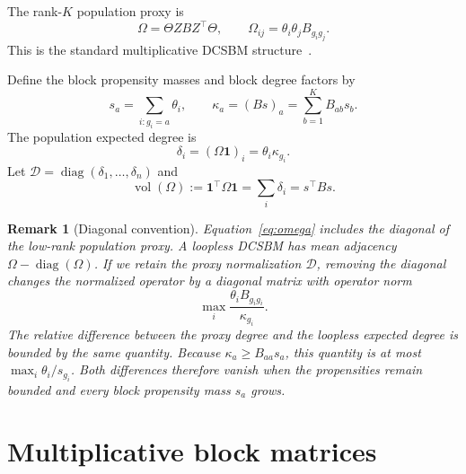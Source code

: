 \documentclass[aps,pre,reprint,superscriptaddress,longbibliography]{revtex4-2}
\newcommand{\ones}{\mathbf{1}}
\DeclareMathOperator{\vol}{vol}
\DeclareMathOperator{\diag}{diag}
\newtheorem{remark}[theorem]{Remark}
\begin{document}
The rank-\(K\) population proxy is
\begin{equation}
    \Omega=\Theta ZBZ^\top\Theta,
    \qquad
    \Omega_{ij}=\theta_i\theta_jB_{g_i g_j}.
    \label{eq:omega}
\end{equation}
This is the standard multiplicative DCSBM structure~\citep{karrer2011stochastic}.

Define the block propensity masses and block degree factors by
\begin{equation}
    s_a=\sum_{i:g_i=a}\theta_i,
    \qquad
    \kappa_a=(Bs)_a=\sum_{b=1}^K B_{ab}s_b.
    \label{eq:block-masses}
\end{equation}
The population expected degree is
\begin{equation}
    \delta_i=(\Omega\ones)_i=\theta_i\kappa_{g_i}.
    \label{eq:expected-degree}
\end{equation}
Let \(\mathcal{D}=\diag(\delta_1,\dots,\delta_n)\) and
\begin{equation}
    \vol(\Omega)
    :=\ones^\top\Omega\ones
    =\sum_i\delta_i
    =s^\top Bs.
    \label{eq:volume}
\end{equation}

\begin{remark}[Diagonal convention]
Equation~\eqref{eq:omega} includes the diagonal of the low-rank population proxy.
A loopless DCSBM has mean adjacency
\(\Omega-\diag(\Omega)\).
If we retain the proxy normalization \(\mathcal{D}\), removing the diagonal changes the normalized operator by a diagonal matrix with operator norm
\begin{equation}
    \max_i \frac{\theta_i B_{g_i g_i}}{\kappa_{g_i}}.
    \label{eq:diagonal-perturbation}
\end{equation}
The relative difference between the proxy degree and the loopless expected degree is bounded by the same quantity.
Because \(\kappa_a\geq B_{aa}s_a\), this quantity is at most \(\max_i\theta_i/s_{g_i}\).
Both differences therefore vanish when the propensities remain bounded and every block propensity mass \(s_a\) grows.
\end{remark}

\section{Multiplicative block matrices}
\label{sec:factorization-lemma}
\end{document}
